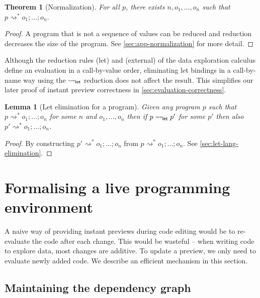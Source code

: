 \documentclass[english,crc,references=cleveref]{programming}
\newcounter{thc}
\theoremstyle{plain}
\newtheorem{lem}[thc]{Lemma}
\newtheorem{theorem}[thc]{Theorem}
\theoremstyle{definition}
\newcommand{\ident}[1]{\textnormal{\textcolor{idclr}{\sffamily #1}}}
\newcommand{\rname}[1]{{\sffamily(#1)}}
\begin{document}
\begin{theorem}[Normalization]
\label{thm:normalization}
For all $p$, there exists $n, o_1, \ldots, o_n$ such that $p\rightsquigarrow^{*} o_1;\ldots;o_n$.
\end{theorem}
\begin{proof}
A program that is not a sequence of values can be reduced and reduction decreases the size of the
program. See \cref{sec:app-normalization} for more detail.
\end{proof}
%
%
Although the reduction rules \rname{let} and \rname{external} of the data exploration calculus
define an evaluation in a call-by-value order, eliminating let bindings in a call-by-name way
using the $\rightsquigarrow_\ident{let}$ reduction does not affect the result. This
simplifies our later proof of instant preview correctness in \cref{sec:evaluation-correctness}.

\begin{lem}[Let elimination for a program]
\label{thm:let-lang-elimination}
Given any program $p$ such that $p \rightsquigarrow^{*} o_1;\ldots;o_n$ for some $n$ and $o_1, \ldots, o_n$
then if $p \rightsquigarrow_\ident{let} p'$ for some $p'$ then also $p' \rightsquigarrow^{*} o_1;\ldots;o_n$.
\end{lem}
\begin{proof}
By constructing $p' \rightsquigarrow^{*} o_1;\ldots;o_n$ from
$p \rightsquigarrow^{*} o_1;\ldots;o_n$. See \cref{sec:let-lang-elimination}.
\end{proof}


\section{Formalising a live programming environment}
\label{sec:formal}

A naive way of providing instant previews during code editing would be to re-evaluate the code
after each change. This would be wasteful -- when writing code to explore data, most changes are
additive. To update a preview, we only need to evaluate newly added code. We describe an
efficient mechanism in this section.


\subsection{Maintaining the dependency graph}
\label{sec:formal-deps}
\end{document}
